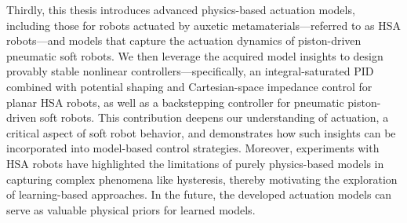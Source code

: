 Thirdly, this thesis introduces advanced physics-based actuation models, including those for robots actuated by auxetic metamaterials—referred to as \gls{HSA} robots—and models that capture the actuation dynamics of piston-driven pneumatic soft robots. We then leverage the acquired model insights to design provably stable nonlinear controllers—specifically, an integral-saturated PID combined with potential shaping and Cartesian-space impedance control for planar \gls{HSA} robots, as well as a backstepping controller for pneumatic piston-driven soft robots. This contribution deepens our understanding of actuation, a critical aspect of soft robot behavior, and demonstrates how such insights can be incorporated into model-based control strategies. Moreover, experiments with \gls{HSA} robots have highlighted the limitations of purely physics-based models in capturing complex phenomena like hysteresis, thereby motivating the exploration of learning-based approaches. In the future, the developed actuation models can serve as valuable physical priors for learned models.

